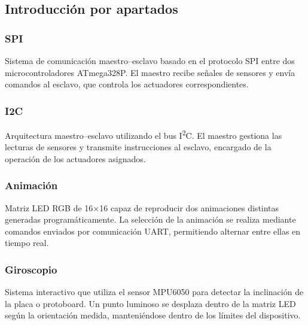 \vspace{1.5em}

\subsection{Introducción por apartados}

\subsubsection{SPI}
Sistema de comunicación maestro–esclavo basado en el protocolo SPI entre dos microcontroladores ATmega328P. El maestro recibe señales de sensores y envía comandos al esclavo, que controla los actuadores correspondientes.

\vspace{1em}

\subsubsection{I2C}
Arquitectura maestro–esclavo utilizando el bus I\textsuperscript{2}C. El maestro gestiona las lecturas de sensores y transmite instrucciones al esclavo, encargado de la operación de los actuadores asignados.

\vspace{1em}

\subsubsection{Animación}
Matriz LED RGB de 16×16 capaz de reproducir dos animaciones distintas generadas programáticamente. La selección de la animación se realiza mediante comandos enviados por comunicación UART, permitiendo alternar entre ellas en tiempo real.

\vspace{1em}

\subsubsection{Giroscopio}
Sistema interactivo que utiliza el sensor MPU6050 para detectar la inclinación de la placa o protoboard. Un punto luminoso se desplaza dentro de la matriz LED según la orientación medida, manteniéndose dentro de los límites del dispositivo.

\vspace{1em}

